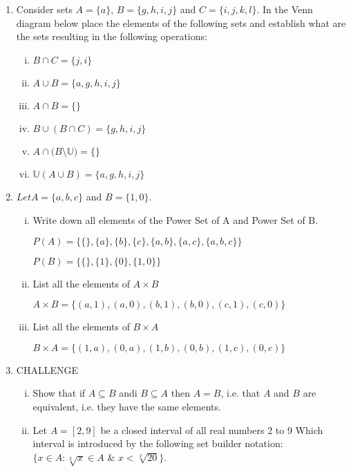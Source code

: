 \documentclass[]{article}
\begin{document}
\begin{enumerate}
\vspace{0.5 cm}
    \item Consider sets $A = \{a\}$, $B = \{g, h, i, j\}$ and $C = \{i, j, k, l\}$. In the Venn diagram below place the elements of the following sets and establish what are the sets resulting in the following operations:

    \begin{enumerate}[i.]
        \item $B \cap C = \{j, i\} $
        \item $A \cup B = \{a, g, h, i, j\}$
        \item $A \cap B = \{ \}$
        \item $B \cup (B \cap C) = \{g, h, i, j\}$
        \item $A \cap (B$\textbackslash$ \mathbb{U}) = \{ \}$
        \item $\mathbb{U}(A\cup B) = \{a, g, h, i, j\}$
    \end{enumerate}
\vspace{0.5 cm}
    \item $Let A = \{a, b, c\}$ and $B = \{1, 0\}.$
        
    \begin{enumerate}[i.]
        \item Write down all elements of the Power Set of A and Power Set of B.
            
            $P(A)= \{\{ \}, \{a\}, \{b\}, \{c\}, \{a, b\}, \{a, c\}, \{a, b, c\} \}$

            $P(B)= \{ \{ \}, \{1\}, \{0\}, \{1, 0\} \}$

        \item List all the elements of $A \times B$

            $A \times B = \{ (a, 1), (a, 0), (b, 1), (b, 0), (c, 1), (c, 0) \}$

        \item List all the elements of $B \times A$

            $B \times A = \{ (1, a), (0, a), (1, b), (0, b), (1, c), (0, c) \}$

    \end{enumerate}
\vspace{0.5 cm}
\item CHALLENGE

    \begin{enumerate}[i.]
        \item Show that if $A \subseteq B$ andi $ B \subseteq A$ then $ A = B$, i.e. that $A$ and $B$ are equivalent, i.e. they have the same elements.
        \item Let $A = [2,9]$ be a closed interval of all real numbers 2 to 9 Which interval is introduced by the following set builder notation:$ \{x\in A : \sqrt[2]{x} \in A$ \& $ x < \sqrt[2]{20} \}$.
    \end{enumerate}

\vspace{0.5 cm}
\end{enumerate}
\end{document}
